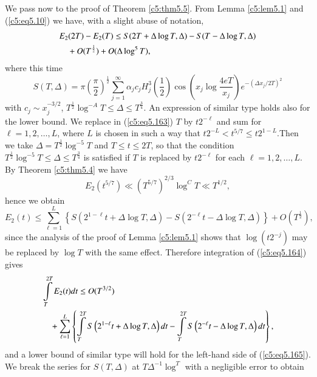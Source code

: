 We pass now to the proof of Theorem \ref{c5:thm5.5}. From Lemma
\ref{c5:lem5.1} and (\ref{c5:eq5.10}) we have, with a slight abuse of
notation, 
\begin{align}
& E_2 (2T) - E_2 (T) \leq S (2T + \Delta \log T,\Delta) - S(T -\Delta 
\log T,\Delta) 
\label{c5:eq5.163}\\
&\quad + O (T^{\frac{1}{2}}) + O(\Delta \log^5 T),\notag
\end{align}    
where this time
$$
S (T,\Delta)  = \pi \left(\frac{\pi}{2} \right)^{\frac{1}{2}}
\sum\limits^\infty_{j=1} \alpha_j c_j H^3_j \left(\frac{1}{2} \right)
\cos \left(x_j \log \frac{4eT}{x_j} \right) e^{-(\Delta x_j / 2T)^2} 
$$
with $c_j \sim x^{-3/2}_j$, $T^{\frac{1}{2}} \log^{-A} T \leq \Delta
\leq T^{\frac{3}{4}}$. An expression of similar type holds also for
the lower bound. We replace in (\ref{c5:eq5.163}) $T$ by $t 2^{-\ell}$
and sum for $\ell = 1,2,\ldots, L$, where $L$ is chosen in such a way
that $t 2^{-L} < t^{5/7} \leq t2^{1-L}$.\pageoriginale Then we take
$\Delta = T^{\frac{1}{2}} \log^{-5} T$ and $T \leq t \leq 2 T$, so
that the condition $T^{\frac{1}{2}} \log^{-5} T \leq \Delta \leq
T^{\frac{3}{4}}$ is satisfied if $T$ is replaced by $t2^{-\ell}$ for
each $\ell =1,2,\ldots, L$. By Theorem \ref{c5:thm5.4} we have 
$$
E_2 (t^{5/7}) \ll (T^{5/7})^{2/3} \log^C T \ll T^{1/2},
$$
hence we obtain
{\fontsize{10pt}{12pt}\selectfont
\begin{equation}
E_2 (t) \leq \sum\limits^L_{\ell=1} \left\{ S\left(2^{1-\ell} t+
\Delta \log T,\Delta\right) - S\left(2^{-\ell} t -\Delta \log T,
\Delta\right) \right\} +  O 
(T^{\frac{1}{2}}), \label{c5:eq5.164}
\end{equation}}
since the analysis of the proof of Lemma \ref{c5:lem5.1} shows that
$\log (t 2^{-j})$ may be replaced by $\log T$ with the same
effect. Therefore integration of (\ref{c5:eq5.164}) gives 
\begin{align}
& \int\limits^{2T}_T E_2 (t) dt \leq O (T^{3/2})\label{c5:eq5.165}\\
&\quad + \sum\limits^{L}_{\ell =1} \left\{\int\limits^{2T}_T
  S\left(2^{1-\ell} t+ \Delta \log T,\Delta\right) dt - \int\limits^{2T}_T
  S\left(2^{-\ell} t - \Delta \log T, \Delta\right) dt \right\},\notag 
\end{align} 
and a lower bound of similar type will hold for the left-hand side of
(\ref{c5:eq5.165}). We break the series for $S(T,\Delta)$ at $T
\Delta^{-1} \log^T$ with a negligible error to obtain 
